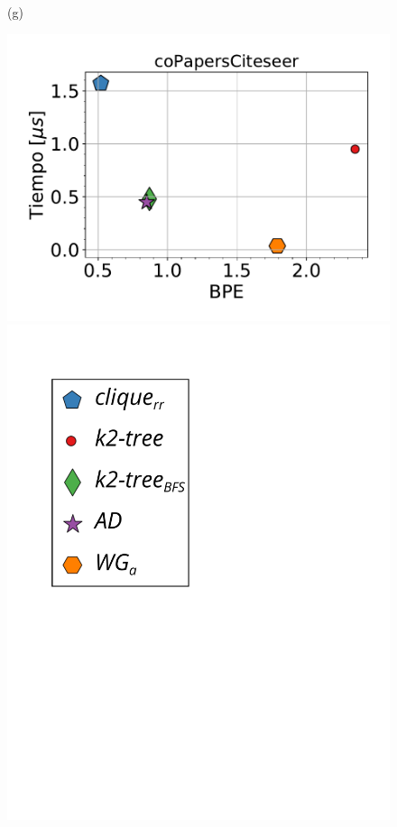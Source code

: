 \begin{figure}
\begin{minipage}{1\textwidth}
\begin{minipage}{0.45\textwidth}
    			(g)
    		\end{minipage}
    		\begin{minipage}{0.45\textwidth}
    			\centering
    			\begin{minipage}{0.75\textwidth}
    				\centering
    				\includegraphics[width=1\linewidth]{img/bpeTimes/aleatorio/coPapersCiteseer.pdf}
    			\end{minipage}
    			\begin{minipage}{0.2\textwidth}
    				\centering
    				\includegraphics[scale=.2, clip, trim=60 194 0 0]{img/bpeTimes/labelAle.pdf}
    			\end{minipage}
    			

\end{minipage}
\end{minipage}
\end{figure}
